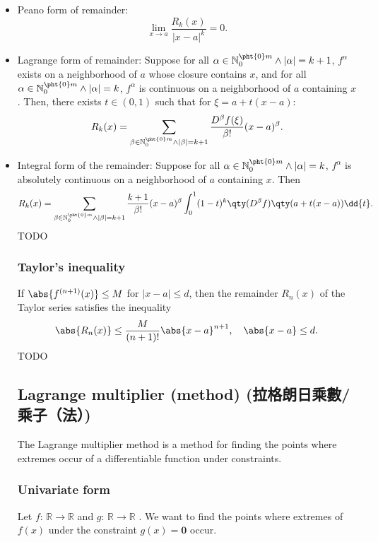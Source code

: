 \documentclass[a4paper,12pt]{report}
\begin{document}
\begin{itemize}
\begin{itemize}
\subsubsection{Taylor's theorem on higher dimensions}
Let $k,m\in\bbN$, and function $f\colon D\subseteq\bbR^m\to\bbR$ be $k$ times differentiable at a point $a\in D$. Then there exists a real-valued function $R_k$ defined on a neighborhood of $a$ such that
\[f(x)=\sum_{\alpha\in\mathbb{N}_0^{\pht{0}m}\land |\alpha|\leq k}\frac{D^{\alpha}f(a)}{\alpha !}(x-a)^{\alpha}+R_k(x),\]
and that
\bit
\item Peano form of remainder:
\[\lim_{x\to a}\frac{R_k(x)}{|x-a|^k}=0.\]
\item Lagrange form of remainder: Suppose for all $\alpha\in\mathbb{N}_0^{\pht{0}m}\land |\alpha|=k+1$, $f^{\alpha}$ exists on a neighborhood of $a$ whose closure contains $x$, and for all $\alpha\in\mathbb{N}_0^{\pht{0}m}\land |\alpha|=k$, $f^{\alpha}$ is continuous on a neighborhood of $a$ containing $x$. Then, there exists $t\in (0,1)$ such that for $\xi=a+t(x-a)$:
\[R_k(x)=\sum_{\beta\in\mathbb{N}_0^{\pht{0}m}\land |\beta|=k+1}\frac{D^{\beta}f(\xi)}{\beta!}(x-a)^{\beta}.\]
\item Integral form of the remainder: Suppose for all $\alpha\in\mathbb{N}_0^{\pht{0}m}\land |\alpha|=k$, $f^{\alpha}$ is absolutely continuous on a neighborhood of $a$ containing $x$. Then
\[R_k(x)=\sum_{\beta\in\mathbb{N}_0^{\pht{0}m}\land |\beta|=k+1}\frac{k+1}{\beta!}(x-a)^{\beta}\int_0^1(1-t)^k\qty(D^{\beta}f)\qty(a+t(x-a))\dd{t}.\]
\eit
\bpr
TODO
\epr
\subsubsection{Taylor's inequality}
If $\abs{f^{(n+1)}(x)}\leq M$ for $|x-a|\le d$, then the remainder $R_n(x)$ of the Taylor series satisfies the inequality
\[\abs{R_n(x)}\le\frac{M}{(n+1)!}\abs{x-a}^{n+1},\quad\abs{x-a}\le d.\]
\bpr
TODO
\epr
\subsection{Lagrange multiplier (method) (拉格朗日乘數/乘子（法）)}
The Lagrange multiplier method is a method for finding the points where extremes occur of a differentiable function under constraints.
\subsubsection{Univariate form}
Let $f:\,\mathbb{R} \rightarrow \mathbb{R}$ and $g:\,\mathbb{R} \rightarrow \mathbb{R}$ . We want to find the points where extremes of \( f(x) \) under the constraint \( g(x) = \mathbf{0} \) occur. 


\end{itemize}
\end{itemize}
\end{document}
